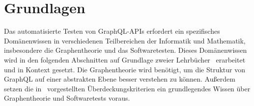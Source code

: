\chapter{Grundlagen}
\label{theorie}

Das automatisierte Testen von GraphQL-APIs erfordert ein spezifisches Domänenwissen in verschiedenen Teilbereichen der
Informatik und Mathematik, insbesondere die Graphentheorie und das Softwaretesten.
Dieses Domänenwissen wird in den folgenden Abschnitten auf Grundlage zweier Lehrbücher~\cite{software-testing,graphentheorie} erarbeitet
und in Kontext gesetzt.
Die Graphentheorie wird benötigt, um die Struktur von GraphQL auf einer abstrakten Ebene besser verstehen zu können.
Außerdem setzen die in~\cite{software-testing} vorgestellten Überdeckungskriterien ein grundlegendes Wissen über Graphentheorie und Softwaretests voraus.